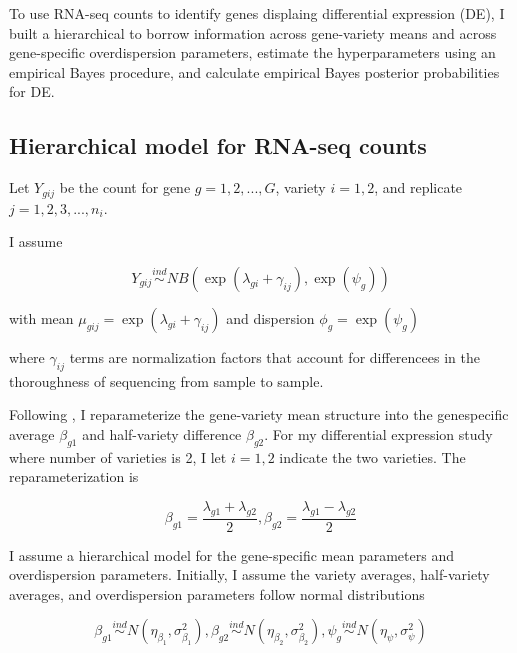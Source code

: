 \documentclass[11pt]{isuthesis}
\begin{document}
To use RNA-seq counts to identify genes displaing differential expression (DE), I built a hierarchical to borrow information across gene-variety means and across gene-specific overdispersion parameters, estimate the hyperparameters using an empirical Bayes procedure, and calculate empirical Bayes posterior probabilities for DE. 

\subsection{Hierarchical model for RNA-seq counts}

Let $Y_{gij}$ be the count for gene $g=1,2,..., G$, variety $i=1,2$, and replicate $j=1,2,3,...,n_i$.

I assume

\begin{equation}
\label{eq:1}
Y_{gij} \stackrel{ind}{\sim} NB(\exp(\lambda_{gi}+\gamma_{ij}), \exp(\psi_g))
\end{equation}

with mean $\mu_{gij} = \exp{(\lambda_{gi}+\gamma_{ij})}$ and dispersion $\phi_g = \exp{(\psi_g)}$

where $\gamma_{ij}$ terms are normalization factors that account for differencees in the thoroughness of sequencing from sample to sample. 

Following \citep{ji2014estimation}, I reparameterize the gene-variety mean structure into the genespecific average $\beta_{g1}$ and half-variety difference $\beta_{g2}$. For my differential expression study where number of varieties is 2, I let $i=1,2$ indicate the two varieties. The reparameterization is

\begin{equation}
\label{eq:2}
\beta_{g1} = \frac{\lambda_{g1}+\lambda_{g2}}{2}, \beta_{g2} = \frac{\lambda_{g1}-\lambda_{g2}}{2}
\end{equation}

I assume a hierarchical model for the gene-specific mean parameters and overdispersion parameters. Initially, I assume the variety averages, half-variety averages, and overdispersion parameters follow normal distributions

\begin{equation}
\label{eq:3}
\beta_{g1} \stackrel{ind}{\sim} N(\eta_{\beta_1}, \sigma^2_{\beta_1}), \beta_{g2} \stackrel{ind}{\sim} N(\eta_{\beta_2} , \sigma^2_{\beta_2}), \psi_g \stackrel{ind}{\sim} N(\eta_\psi, \sigma^2_\psi)
\end{equation}
\end{document}
